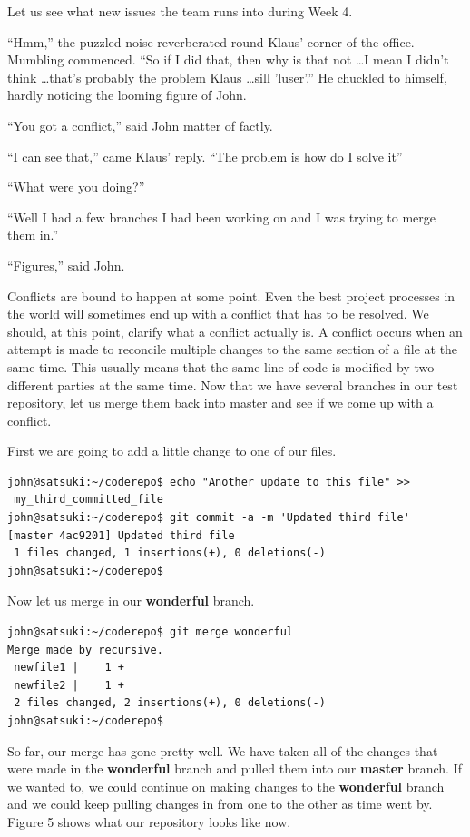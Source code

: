 Let us see what new issues the team runs into during Week 4.

\begin{trenches}
``Hmm,'' the puzzled noise reverberated round Klaus' corner of the office.  Mumbling commenced.  ``So if I did that, then why is that not \ldots I mean I didn't think \ldots that's probably the problem Klaus \ldots sill 'luser'.''  He chuckled to himself, hardly noticing the looming figure of John.

``You got a conflict,'' said John matter of factly.

``I can see that,'' came Klaus' reply.  ``The problem is how do I solve it''

``What were you doing?''

``Well I had a few branches I had been working on and I was trying to merge them in.''

``Figures,'' said John.  
\end{trenches}

Conflicts are bound to happen at some point.  Even the best project processes in the world will sometimes end up with a conflict that has to be resolved.  We should, at this point, clarify what a conflict actually is.  A conflict occurs when an attempt is made to reconcile multiple changes to the same section of a file at the same time.  This usually means that the same line of code is modified by two different parties at the same time.  Now that we have several branches in our test repository, let us merge them back into master and see if we come up with a conflict.

First we are going to add a little change to one of our files.

\begin{Verbatim}
john@satsuki:~/coderepo$ echo "Another update to this file" >> 
 my_third_committed_file 
john@satsuki:~/coderepo$ git commit -a -m 'Updated third file'
[master 4ac9201] Updated third file
 1 files changed, 1 insertions(+), 0 deletions(-)
john@satsuki:~/coderepo$ 
\end{Verbatim}

Now let us merge in our \textbf{wonderful} branch.

\begin{Verbatim}
john@satsuki:~/coderepo$ git merge wonderful
Merge made by recursive.
 newfile1 |    1 +
 newfile2 |    1 +
 2 files changed, 2 insertions(+), 0 deletions(-)
john@satsuki:~/coderepo$ 
\end{Verbatim}

So far, our merge has gone pretty well.  We have taken all of the changes that were made in the \textbf{wonderful} branch and pulled them into our \textbf{master} branch.  If we wanted to, we could continue on making changes to the \textbf{wonderful} branch and we could keep pulling changes in from one to the other as time went by.  Figure 5 shows what our repository looks like now.


